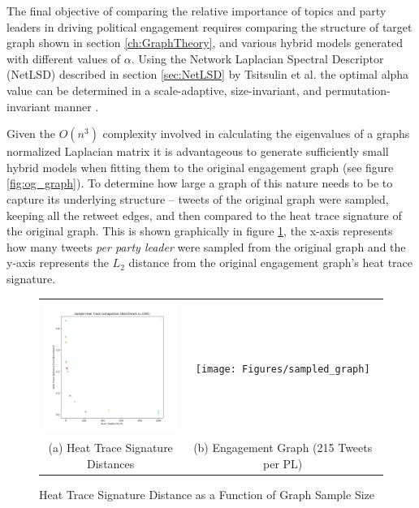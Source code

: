 The final objective of comparing the relative importance of topics and party
leaders in driving political engagement requires comparing the structure of
target graph shown in section \ref{ch:GraphTheory}, and various hybrid models generated
with different values of $\alpha$. Using the Network Laplacian Spectral
Descriptor (NetLSD) described in section \ref{sec:NetLSD} by Tsitsulin et al. the optimal
alpha value can be determined in a scale-adaptive, size-invariant, and
permutation-invariant manner \cite{netlsd}.

Given the $O(n^{3})$ complexity involved in calculating the eigenvalues of a
graphs normalized Laplacian matrix it is advantageous to generate sufficiently
small hybrid models when fitting them to the original engagement graph (see
figure \ref{fig:og_graph}). To determine how large a graph of this nature needs
to be to capture its underlying structure -- tweets of the original graph were
sampled, keeping all the retweet edges, and then compared to the heat trace
signature of the original graph. This is shown graphically in figure
\ref{fig:dist_from_original_graph_over_sample_size}, the x-axis represents how
many tweets \emph{per party leader} were sampled from the original graph and the
y-axis represents the $L_{2}$ distance from the original engagement graph's heat
trace signature. 

\begin{singlespacing}
    \begin{figure}[H]
    \centering
    \begin{tabular}{cc}
        \includegraphics[width=50mm]{Figures/dist_from_original_graph_over_sample_size} &
        \texttt{[image: Figures/sampled\_graph]} \\
        (a) Heat Trace Signature Distances & (b) Engagement Graph (215 Tweets per PL)\\[6pt]
    \end{tabular}
    \caption[Heat Trace Signature Distance as a Function of Graph Sample Size]{Heat Trace Signature Distance as a Function of Graph Sample Size}
    \label{fig:dist_from_original_graph_over_sample_size}
    \end{figure}
\end{singlespacing}

